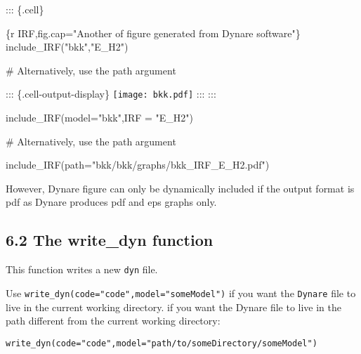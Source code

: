 \documentclass[
  letterpaper,
  DIV=11,
  numbers=noendperiod]{scrartcl}
\newenvironment{Shaded}{\begin{snugshade}}{\end{snugshade}}
\newcommand{\AttributeTok}[1]{\textcolor[rgb]{0.40,0.45,0.13}{#1}}
\newcommand{\CommentTok}[1]{\textcolor[rgb]{0.37,0.37,0.37}{#1}}
\newcommand{\FunctionTok}[1]{\textcolor[rgb]{0.28,0.35,0.67}{#1}}
\newcommand{\InformationTok}[1]{\textcolor[rgb]{0.37,0.37,0.37}{#1}}
\newcommand{\NormalTok}[1]{\textcolor[rgb]{0.00,0.23,0.31}{#1}}
\newcommand{\StringTok}[1]{\textcolor[rgb]{0.13,0.47,0.30}{#1}}
\begin{document}
::: \{.cell\}

\begin{Shaded}
\begin{Highlighting}[]
\InformationTok{\textasciigrave{}\textasciigrave{}\textasciigrave{}\{r IRF,fig.cap="Another of figure generated from Dynare software"\}}
\FunctionTok{include\_IRF}\NormalTok{(}\StringTok{"bkk"}\NormalTok{,}\StringTok{"E\_H2"}\NormalTok{)}

   \CommentTok{\# Alternatively, use the path argument }
\InformationTok{\textasciigrave{}\textasciigrave{}\textasciigrave{}}
\end{Highlighting}
\end{Shaded}

::: \{.cell-output-display\} \texttt{[image: bkk.pdf]} ::: :::

\begin{Shaded}
\begin{Highlighting}[]
\FunctionTok{include\_IRF}\NormalTok{(}\AttributeTok{model=}\StringTok{"bkk"}\NormalTok{,}\AttributeTok{IRF =} \StringTok{"E\_H2"}\NormalTok{)}

\CommentTok{\# Alternatively, use the path argument }

\FunctionTok{include\_IRF}\NormalTok{(}\AttributeTok{path=}\StringTok{"bkk/bkk/graphs/bkk\_IRF\_E\_H2.pdf"}\NormalTok{)}
\end{Highlighting}
\end{Shaded}

However, Dynare figure can only be dynamically included if the output
format is pdf as Dynare produces pdf and eps graphs only.

\hypertarget{the-write_dyn-function}{%
\subsection{6.2 The write\_dyn function}\label{the-write_dyn-function}}

This function writes a new \texttt{dyn} file.

Use \texttt{write\_dyn(code="code",model="someModel")} if you want the
\texttt{Dynare} file to live in the current working directory. if you
want the Dynare file to live in the path different from the current
working directory:

\texttt{write\_dyn(code="code",model="path/to/someDirectory/someModel")}
\end{document}
